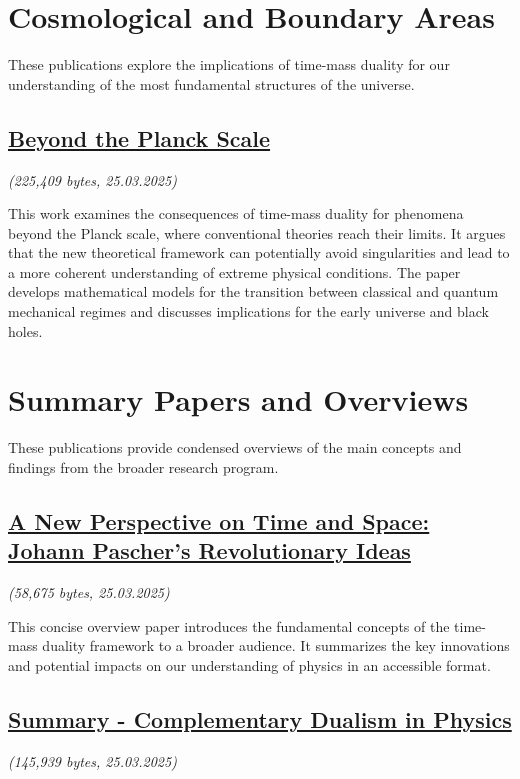 \documentclass[a4paper,12pt]{article}
\newcommand{\repobase}{https://github.com/jpascher/T0-Time-Mass-Duality/tree/main/2/}
\begin{document}
	\section{Cosmological and Boundary Areas}
	
	These publications explore the implications of time-mass duality for our understanding of the most fundamental structures of the universe.
	
	\subsection{\href{\repobase pdf/English/Beyond the Planck Scale.pdf}{Beyond the Planck Scale}}
	\textit{(225,409 bytes, 25.03.2025)}
	
	This work examines the consequences of time-mass duality for phenomena beyond the Planck scale, where conventional theories reach their limits. It argues that the new theoretical framework can potentially avoid singularities and lead to a more coherent understanding of extreme physical conditions. The paper develops mathematical models for the transition between classical and quantum mechanical regimes and discusses implications for the early universe and black holes.
	
	\section{Summary Papers and Overviews}
	
	These publications provide condensed overviews of the main concepts and findings from the broader research program.
	
	\subsection{\href{\repobase pdf/English/A New Perspective on Time and Space Johann Pascher's Revolutionary Ideas.pdf}{A New Perspective on Time and Space: Johann Pascher's Revolutionary Ideas}}
	\textit{(58,675 bytes, 25.03.2025)}
	
	This concise overview paper introduces the fundamental concepts of the time-mass duality framework to a broader audience. It summarizes the key innovations and potential impacts on our understanding of physics in an accessible format.
	
	\subsection{\href{\repobase pdf/English/Summary - Complementary Dualism in Physics.pdf}{Summary - Complementary Dualism in Physics}}
	\textit{(145,939 bytes, 25.03.2025)}
	
\end{document}
